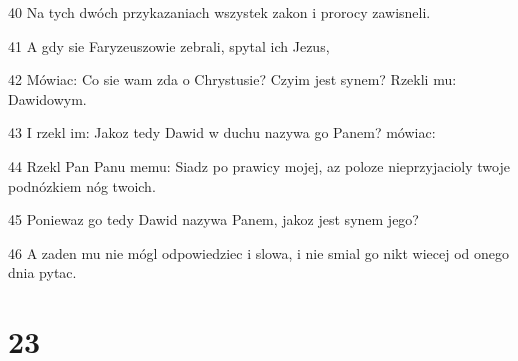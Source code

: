 \par 40 Na tych dwóch przykazaniach wszystek zakon i prorocy zawisneli.
\par 41 A gdy sie Faryzeuszowie zebrali, spytal ich Jezus,
\par 42 Mówiac: Co sie wam zda o Chrystusie? Czyim jest synem? Rzekli mu: Dawidowym.
\par 43 I rzekl im: Jakoz tedy Dawid w duchu nazywa go Panem? mówiac:
\par 44 Rzekl Pan Panu memu: Siadz po prawicy mojej, az poloze nieprzyjacioly twoje podnózkiem nóg twoich.
\par 45 Poniewaz go tedy Dawid nazywa Panem, jakoz jest synem jego?
\par 46 A zaden mu nie mógl odpowiedziec i slowa, i nie smial go nikt wiecej od onego dnia pytac.

\chapter{23}

